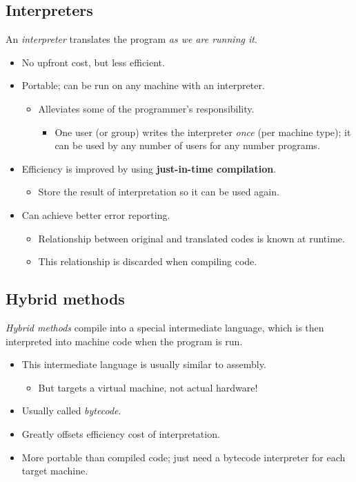 \documentclass[11pt]{article}
\theoremstyle{definition}
\begin{document}
\subsection{Interpreters}
\label{sec:orgaa13a45}
An \emph{interpreter} translates the program \emph{as we are running it}.
\begin{itemize}
\item No upfront cost, but less efficient.
\item Portable; can be run on any machine with an interpreter.
\begin{itemize}
\item Alleviates some of the programmer's responsibility.
\begin{itemize}
\item One user (or group) writes the interpreter \emph{once}
(per machine type);
it can be used by any number of users for any number programs.
\end{itemize}
\end{itemize}
\item Efficiency is improved by using \textbf{just-in-time compilation}.
\begin{itemize}
\item Store the result of interpretation so it can be used again.
\end{itemize}
\item Can achieve better error reporting.
\begin{itemize}
\item Relationship between original and translated codes is known at runtime.
\item This relationship is discarded when compiling code.
\end{itemize}
\end{itemize}

\subsection{Hybrid methods}
\label{sec:orge6ec617}
\emph{Hybrid methods} compile into a special intermediate language,
which is then interpreted into machine code when the program is run.
\begin{itemize}
\item This intermediate language is usually similar to assembly.
\begin{itemize}
\item But targets a virtual machine, not actual hardware!
\end{itemize}
\item Usually called \emph{bytecode}.
\item Greatly offsets efficiency cost of interpretation.
\item More portable than compiled code; just need
a bytecode interpreter for each target machine.
\end{itemize}
\end{document}
